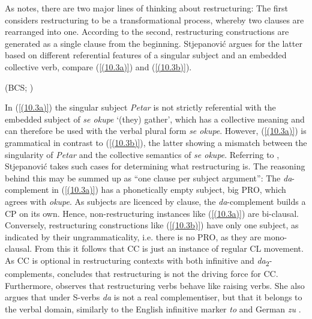 As \citet[186--198]{Stjepanovic04} notes, there are two major lines of thinking about restructuring: The first considers restructuring to be a transformational process, whereby two clauses are rearranged into one. According to the second, restructuring constructions are generated as a single clause from the beginning. Stjepanović argues for the latter based on different referential features of a singular subject and an embedded collective verb, compare (\ref{(10.3a)}) and (\ref{(10.3b)}).

\begin{exe}\ex\begin{xlist}
\hfill (BCS; \citealt[193]{Stjepanovic04})
\end{xlist}
\end{exe}

\noindent In (\ref{(10.3a)}) the singular subject \textit{Petar} is not strictly referential with the embedded subject of \textit{se okupe} ‘(they) gather’, which has a collective meaning and can therefore be used with the verbal plural form \textit{se okupe}. However, (\ref{(10.3a)}) is grammatical in contrast to (\ref{(10.3b)}), the latter showing a mismatch between the singularity of \textit{Petar} and the collective semantics of \textit{se okupe}. Referring to \citet{Wurmbrand99}, Stjepanović takes such cases for determining what restructuring is. The reasoning behind this may be summed up as “one clause per subject argument”: The \textit{da}-complement in (\ref{(10.3a)}) has a phonetically empty subject, big PRO, which agrees with \textit{okupe}. As subjects are licenced by clause, the \textit{da}-complement builds a CP on its own. Hence, non-restructuring instances like (\ref{(10.3a)}) are bi-clausal. Conversely, restructuring constructions like (\ref{(10.3b)}) have only one subject, as indicated by their ungrammaticality, i.e. there is no PRO, as they are mono-clausal. From this it follows that CC is just an instance of regular CL movement. As CC is optional in restructuring contexts with both infinitive and \textit{da}\textsubscript{2}-complements, \citet[206]{Stjepanovic04} concludes that restructuring is not the driving force for CC. Furthermore, \citet[198--204]{Stjepanovic04} observes that restructuring verbs behave like raising verbs. She also argues that under S-verbs \textit{da}  is not a real complementiser, but that it belongs to the verbal domain, similarly to the English infinitive marker \textit{to} and German \textit{zu} \citep[205f]{Stjepanovic04}.

